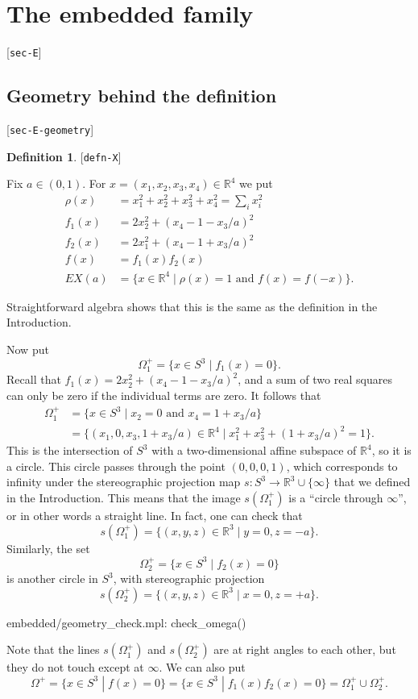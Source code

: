 \documentclass[reqno]{amsart}
\newcommand{\lbl}[1]{\label{#1}\textup{[\texttt{#1}]}\par}
\newcommand{\lbl}{\label}
\newcommand{\Om}        {\Omega}
\newcommand{\R}         {{\mathbb{R}}}
\newcommand{\st}        {\;|\;}
\renewcommand{\:}{\colon}
\theoremstyle{definition}
\newtheorem{definition}[theorem]{Definition}
\begin{document}
\section{The embedded family}
\lbl{sec-E}

\subsection{Geometry behind the definition}
\lbl{sec-E-geometry}

\begin{definition}\lbl{defn-X}
 Fix $a\in (0,1)$.  For $x=(x_1,x_2,x_3,x_4)\in\R^4$ we put
 \begin{align*}
  \rho(x) &= x_1^2+x_2^2+x_3^2+x_4^2 = \sum_i x_i^2 \\
  f_1(x) &= 2 x_2^2 + (x_4-1-x_3/a)^2 \\
  f_2(x) &= 2 x_1^2 + (x_4-1+x_3/a)^2 \\
  f(x)   &= f_1(x)f_2(x) \\
  EX(a)  &= \{x\in\R^4\st \rho(x)=1 \text{ and } f(x)=f(-x) \}.
 \end{align*}
\end{definition}
Straightforward algebra shows that this is the same as the definition
in the Introduction.

Now put
\[ \Om^+_1 = \{x\in S^3 \st f_1(x)=0\}. \]
Recall that $f_1(x)=2 x_2^2 + (x_4-1-x_3/a)^2$, and a sum of two real
squares can only be zero if the individual terms are zero.  It follows that
\begin{align*}
 \Om^+_1 &= \{x\in S^3 \st x_2=0 \text{ and } x_4=1+x_3/a\} \\
  &= \{(x_1,0,x_3,1+x_3/a)\in\R^4 \st x_1^2+x_3^2+(1+x_3/a)^2=1\}.
\end{align*}
This is the intersection of $S^3$ with a two-dimensional affine
subspace of $\R^4$, so it is a circle.  This circle passes through
the point $(0,0,0,1)$, which corresponds to infinity under the
stereographic projection map $s\:S^3\to\R^3\cup\{\infty\}$ that we
defined in the Introduction.  This means that the image $s(\Om^+_1)$
is a ``circle through $\infty$'', or in other
words a straight line.  In fact, one can check that
\[ s(\Om^+_1) = \{(x,y,z)\in\R^3\st y=0,z=-a\}. \]
Similarly, the set
\[ \Om^+_2 = \{x\in S^3 \st f_2(x)=0\} \]
is another circle in $S^3$, with stereographic projection
\[ s(\Om^+_2) = \{(x,y,z)\in\R^3\st x=0,z=+a\}. \]
\begin{checks}
 embedded/geometry_check.mpl: check_omega()
\end{checks}
Note that the lines $s(\Om^+_1)$ and $s(\Om^+_2)$ are at right angles
to each other, but they do not touch except at $\infty$.  We can also
put
\[ \Om^+ = \{x\in S^3\st f(x)=0\} = \{x\in S^3\st f_1(x)f_2(x)=0\}
    = \Om^+_1\cup\Om^+_2.
\]
\end{document}
